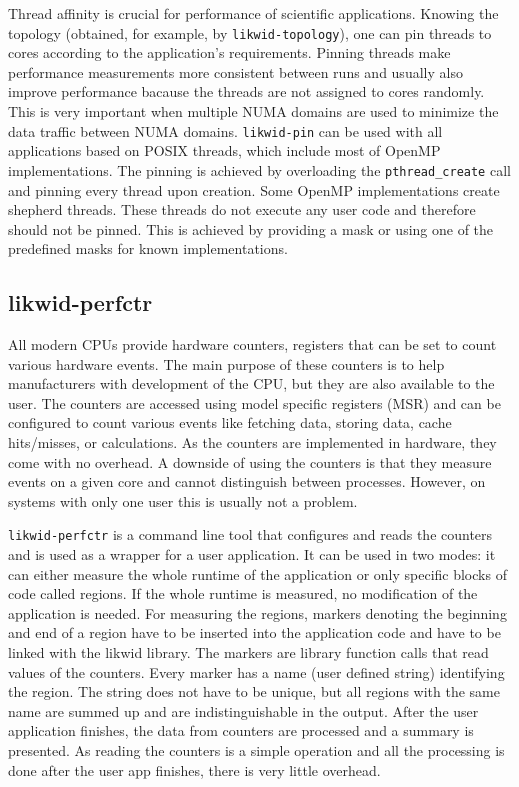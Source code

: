 Thread affinity is crucial for performance of scientific applications. Knowing the topology (obtained, for example, by \texttt{likwid-topology}), one can pin threads to cores according to the application's requirements.
Pinning threads make performance measurements more consistent between runs and usually also improve performance bacause the threads are not assigned to cores randomly. This is very important when multiple NUMA domains are used to minimize the data traffic between NUMA domains.
%
\texttt{likwid-pin} can be used with all applications based on POSIX threads, which include most of OpenMP implementations. The pinning is achieved by overloading the \texttt{pthread\_create} call and pinning every thread upon creation.
Some OpenMP implementations create shepherd threads. These threads do not execute any user code and therefore should not be pinned. This is achieved by providing a mask or using one of the predefined masks for known implementations.

\subsection*{likwid-perfctr}

All modern CPUs provide hardware counters, registers that can be set to count various hardware events. The main purpose of these counters is to help manufacturers with development of the CPU, but they are also available to the user. The counters are accessed using model specific registers (MSR) and can be configured to count various events like fetching data, storing data, cache hits/misses, or calculations. As the counters are implemented in hardware, they come with no overhead. A downside of using the counters is that they measure events on a given core and cannot distinguish between processes. However, on systems with only one user this is usually not a problem.

\texttt{likwid-perfctr} is a command line tool that configures and reads the counters and is used as a wrapper for a user application.
It can be used in two modes: it can either measure the whole runtime of the application or only specific blocks of code called regions.
If the whole runtime is measured, no modification of the application is needed.
For measuring the regions, markers denoting the beginning and end of a region have to be inserted into the application code and have to be linked with the likwid library. The markers are library function calls that read values of the counters. 
Every marker has a name (user defined string) identifying the region. The string does not have to be unique, but all regions with the same name are summed up and are indistinguishable in the output. 
After the user application finishes, the data from counters are processed and a summary is presented. As reading the counters is a simple operation and all the processing is done after the user app finishes, there is very little overhead.

